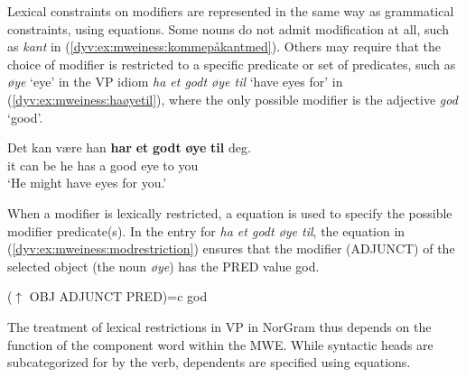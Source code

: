 \documentclass[output=paper]{langsci/langscibook}
\begin{document}
Lexical constraints on modifiers are represented in the same way as grammatical constraints, using equations. 
Some nouns do not admit modification at all, such as \emph{kant} in (\ref{dyv:ex:mweiness:kommepåkantmed}).
Others may require that the choice of modifier is restricted to a specific predicate or set of predicates, such as \textit{øye} `eye' in the VP idiom \emph{ha et godt øye til} `have eyes for' in (\ref{dyv:ex:mweiness:haøyetil}), where the only possible modifier is the adjective \emph{god} `good'.

\ea\label{dyv:ex:mweiness:haøyetil}
\gll Det kan være han \textbf{har} \textbf{et} \textbf{godt} \textbf{øye} \textbf{til} deg. \\
it can be he has a good eye to you \\
\glt `He might have eyes for you.' 
\z

When a modifier is lexically restricted, a  equation is used to specify the possible modifier predicate(s).
In the entry for \emph{ha et godt øye til}, the equation in (\ref{dyv:ex:mweiness:modrestriction}) ensures that the modifier (ADJUNCT) of the selected object (the noun \emph{øye}) has the \textsf{PRED} value \textsf{god}. 

\ea\label{dyv:ex:mweiness:modrestriction}
{\sffamily 
($\uparrow$ OBJ ADJUNCT PRED)=c god \\
}
\z

The treatment of lexical restrictions in VP  in NorGram thus depends on the function of the component word within the MWE. 
While syntactic heads are subcategorized for by the verb, dependents are specified using  equations.
\end{document}
